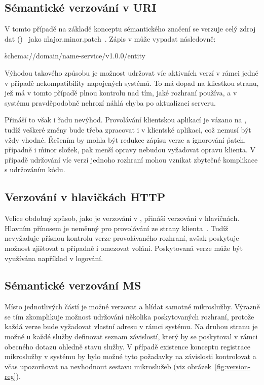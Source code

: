 \subsection{Sémantické verzování v URI}\label{subsec:msa-dependencies-uri}

V tomto případě na základě konceptu sémantického značení se verzuje celý zdroj dat ()~\cite{msversions} jako \h{major.minor.patch}~\cite{semver}.
Zápis v může vypadat následovně:

\h{schema://domain/name-service/v1.0.0/entity}

Výhodou takového způsobu je možnost udržovat víc aktivních  verzí v rámci jedné  v případě nekompatibility napojených systémů.
To má dopad na kliestkou stranu, jež má v tomto případě plnou kontrolu nad tím, jaké rozhraní používa, a v systému pravděpodobně nehrozí náhlá chyba po aktualizaci serveru.

Přináší to však i řadu nevýhod.
Provolávání  klientskou aplikací je vázano na , tudíž veškeré změny bude třeba zpracovat i v klientské aplikaci, což nemusí být vždy vhodné.
Řešením by mohla být redukce zápisu verze a ignorování \h{patch}, případně i \h{minor} složek, pak menší opravy nebudou vyžadovat opravu klienta.
V případě udržování víc verzí jednoho rozhraní mohou vznikat zbytečné komplikace s udržováním kódu.



\subsection{Verzování v hlavičkách HTTP}\label{subsec:msa-dependencies-headers}

Velice obdobný způsob, jako je verzování v , přináší verzování v  hlavičnách.
Hlavním přínosem je neměnný  pro provolávání ze strany klienta~\cite{msversions}.
Tudíž nevyžaduje přísnou kontrolu verze provolávaného rozhraní, avšak poskytuje možnost zjištovat a případně i omezovat volání.
Poskytovaná verze může být využívána například v logování.



\subsection{Sémantické verzování MS}\label{subsec:msa-dependencies-msa}
Místo jednotlivých částí  je možné verzovat a hlídat samotné mikroslužby.
Výrazně se tím zkomplikuje možnost udržování několika poskytovaných rozhraní, protože každá verze bude vyžadovat vlastní adresu v rámci systému.
Na druhou stranu je možné u každé služby definovat seznam závislostí, který by se poskytoval v rámci obecného dotazu ohledně stavu služby.
V případě existence konceptu registrace mikroslužby v systému by bylo možné tyto požadavky na závislosti kontrolovat a včas upozorňovat na nevhodnout sestavu mikroslužeb (viz obrázek~\ref{fig:version-reg}).

